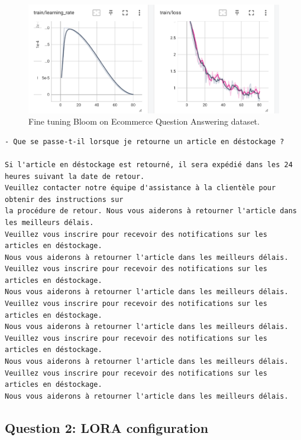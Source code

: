 \documentclass[a4paper]{article}
\begin{document}
\begin{figure}[ht]
    \centering
    \includegraphics[width=.6\textwidth]{figures/training_finetuning_bloom.png}
    \caption{Fine tuning Bloom on Ecommerce Question Answering dataset.}
    \label{fig:finetuning_bloom}
\end{figure}

\begin{verbatim}
- Que se passe-t-il lorsque je retourne un article en déstockage ? 

Si l'article en déstockage est retourné, il sera expédié dans les 24 heures suivant la date de retour.
Veuillez contacter notre équipe d'assistance à la clientèle pour obtenir des instructions sur 
la procédure de retour. Nous vous aiderons à retourner l'article dans les meilleurs délais.
Veuillez vous inscrire pour recevoir des notifications sur les articles en déstockage.
Nous vous aiderons à retourner l'article dans les meilleurs délais.
Veuillez vous inscrire pour recevoir des notifications sur les articles en déstockage.
Nous vous aiderons à retourner l'article dans les meilleurs délais.
Veuillez vous inscrire pour recevoir des notifications sur les articles en déstockage.
Nous vous aiderons à retourner l'article dans les meilleurs délais.
Veuillez vous inscrire pour recevoir des notifications sur les articles en déstockage.
Nous vous aiderons à retourner l'article dans les meilleurs délais.
Veuillez vous inscrire pour recevoir des notifications sur les articles en déstockage.
Nous vous aiderons à retourner l'article dans les meilleurs délais.
\end{verbatim}

\subsection*{Question 2: LORA configuration}


\end{document}
